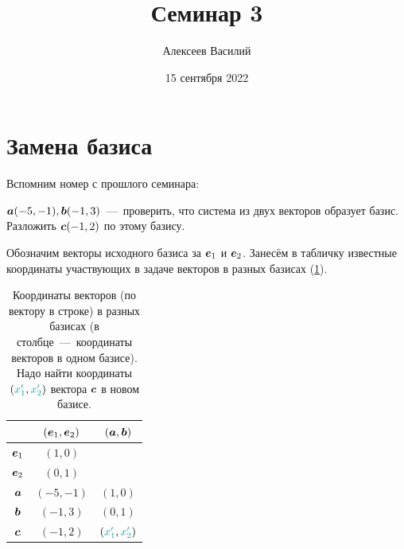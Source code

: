 \documentclass[a4paper,12pt]{article}
\author{Алексеев Василий}
\title{Семинар 3}
\date{15 сентября 2022}
\begin{document}
  \maketitle
  
  \tableofcontents

  \thispagestyle{empty}
  
  \newpage
  


  \section{Замена базиса}
  
  Вспомним номер с прошлого семинара:
  \begin{problem}[1.6]
    $\boldsymbol a(-5, -1), \boldsymbol b(-1, 3)$~---~проверить, что система из двух векторов образует базис.
    Разложить $\boldsymbol c(-1, 2)$ по этому базису.
  \end{problem}
  
  \begin{solution}
    Обозначим векторы исходного базиса за $\boldsymbol e_1$ и $\boldsymbol e_2$.
    Занесём в табличку известные координаты участвующих в задаче векторов в разных базисах (\ref{fig:different-basises}).
    
    \begin{table}[h]
      \centering
    
      \caption{Координаты векторов (по вектору в строке) в разных базисах (в столбце~---~координаты векторов в одном базисе). Надо найти координаты $(\textcolor{my-cyan}{x_1'}, \textcolor{my-cyan}{x_2'})$ вектора $\boldsymbol c$ в новом базисе.}
      \label{fig:different-basises}
      
      \begin{tabular}{c|cc}
        \toprule
        {}          & $(\boldsymbol e_1, \boldsymbol e_2)$ & $(\boldsymbol a, \boldsymbol b)$\\
        \midrule
        $\boldsymbol e_1$  & $(1, 0)$    & ${}$\\
        $\boldsymbol e_2$  & $(0, 1)$    & ${}$\\
        \midrule
        $\boldsymbol a$    & $(-5, -1)$  & $(1, 0)$\\
        $\boldsymbol b$    & $(-1, 3)$   & $(0, 1)$\\
        \midrule
        $\boldsymbol c$    & $(-1, 2)$   & $(\textcolor{my-cyan}{x_1'}, \textcolor{my-cyan}{x_2'})$\\
        \bottomrule
      \end{tabular}
    \end{table}
  \end{solution}
  
\end{document}
